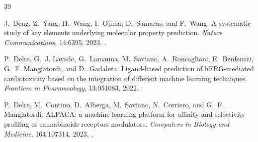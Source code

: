 \begin{thebibliography}{39}
\begin{roundtworevision}
J.~Deng, Z.~Yang, H.~Wang, I.~Ojima, D.~Samaras, and F.~Wang.
\newblock A systematic study of key elements underlying molecular property prediction.
\newblock \emph{Nature Communications}, 14:6395, 2023.
\newblock {}.
\end{roundtworevision}

\begin{roundtworevision}
P.~Delre, G.~J. Lavado, G.~Lamanna, M.~Saviano, A.~Roncaglioni, E.~Benfenati, G.~F. Mangiatordi, and D.~Gadaleta.
\newblock Ligand-based prediction of hERG-mediated cardiotoxicity based on the integration of different machine learning techniques.
\newblock \emph{Frontiers in Pharmacology}, 13:951083, 2022.
\newblock {}.
\end{roundtworevision}

\begin{roundtworevision}
P.~Delre, M.~Contino, D.~Alberga, M.~Saviano, N.~Corriero, and G.~F. Mangiatordi.
\newblock ALPACA: a machine learning platform for affinity and selectivity profiling of cannabinoids receptors modulators.
\newblock \emph{Computers in Biology and Medicine}, 164:107314, 2023.
\newblock {}.
\end{roundtworevision}

\end{thebibliography}

